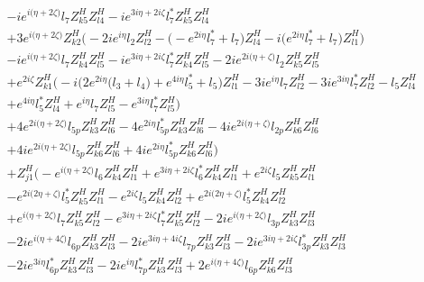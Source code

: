 \begin{align}
 &-i e^{i \Big(\eta +2 \zeta \Big)} l_7 Z_{{k 5}}^{H} Z_{{l 4}}^{H} -i e^{3 i \eta +2 i \zeta } l_7^* Z_{{k 5}}^{H} Z_{{l 4}}^{H} \nonumber \\ 
 &+3 e^{i \Big(\eta +2 \zeta \Big)} Z_{{k 2}}^{H} \Big(-2 i e^{i \eta } l_2 Z_{{l 2}}^{H}  - \Big(- e^{2 i \eta } l_7^*  + l_7\Big)Z_{{l 4}}^{H}  -i \Big(e^{2 i \eta } l_7^*  + l_7\Big)Z_{{l 1}}^{H} \Big)\nonumber \\ 
 &-i e^{i \Big(\eta +2 \zeta \Big)} l_7 Z_{{k 4}}^{H} Z_{{l 5}}^{H} -i e^{3 i \eta +2 i \zeta } l_7^* Z_{{k 4}}^{H} Z_{{l 5}}^{H} -2 i e^{2 i \Big(\eta +\zeta \Big)} l_2 Z_{{k 5}}^{H} Z_{{l 5}}^{H} \nonumber \\ 
 &+e^{2 i \zeta } Z_{{k 1}}^{H} \Big(-i \Big(2 e^{2 i \eta } \Big(l_3 + l_4\Big) + e^{4 i \eta } l_5^*  + l_5\Big)Z_{{l 1}}^{H} -3 i e^{i \eta } l_7 Z_{{l 2}}^{H} -3 i e^{3 i \eta } l_7^* Z_{{l 2}}^{H} - l_5 Z_{{l 4}}^{H} \nonumber \\ 
 &+e^{4 i \eta } l_5^* Z_{{l 4}}^{H} +e^{i \eta } l_7 Z_{{l 5}}^{H} - e^{3 i \eta } l_7^* Z_{{l 5}}^{H} \Big)\nonumber \\ 
 &+4 e^{2 i \Big(\eta +2 \zeta \Big)} l_{5p} Z_{{k 3}}^{H} Z_{{l 6}}^{H} -4 e^{2 i \eta } l_{5p}^* Z_{{k 3}}^{H} Z_{{l 6}}^{H} -4 i e^{2 i \Big(\eta +\zeta \Big)} l_{2p} Z_{{k 6}}^{H} Z_{{l 6}}^{H} \nonumber \\ 
 &+4 i e^{2 i \Big(\eta +2 \zeta \Big)} l_{5p} Z_{{k 6}}^{H} Z_{{l 6}}^{H} +4 i e^{2 i \eta } l_{5p}^* Z_{{k 6}}^{H} Z_{{l 6}}^{H} \Big)\nonumber \\ 
 &+Z_{{j 1}}^{H} \Big(- e^{i \Big(\eta +2 \zeta \Big)} l_6 Z_{{k 4}}^{H} Z_{{l 1}}^{H} +e^{3 i \eta +2 i \zeta } l_6^* Z_{{k 4}}^{H} Z_{{l 1}}^{H} +e^{2 i \zeta } l_5 Z_{{k 5}}^{H} Z_{{l 1}}^{H} \nonumber \\ 
 &- e^{2 i \Big(2 \eta +\zeta \Big)} l_5^* Z_{{k 5}}^{H} Z_{{l 1}}^{H} - e^{2 i \zeta } l_5 Z_{{k 4}}^{H} Z_{{l 2}}^{H} +e^{2 i \Big(2 \eta +\zeta \Big)} l_5^* Z_{{k 4}}^{H} Z_{{l 2}}^{H} \nonumber \\ 
 &+e^{i \Big(\eta +2 \zeta \Big)} l_7 Z_{{k 5}}^{H} Z_{{l 2}}^{H} - e^{3 i \eta +2 i \zeta } l_7^* Z_{{k 5}}^{H} Z_{{l 2}}^{H} -2 i e^{i \Big(\eta +2 \zeta \Big)} l_{3p} Z_{{k 3}}^{H} Z_{{l 3}}^{H} \nonumber \\ 
 &-2 i e^{i \Big(\eta +4 \zeta \Big)} l_{6p} Z_{{k 3}}^{H} Z_{{l 3}}^{H} -2 i e^{3 i \eta +4 i \zeta } l_{7p} Z_{{k 3}}^{H} Z_{{l 3}}^{H} -2 i e^{3 i \eta +2 i \zeta } l_{3p}^* Z_{{k 3}}^{H} Z_{{l 3}}^{H} \nonumber \\ 
 &-2 i e^{3 i \eta } l_{6p}^* Z_{{k 3}}^{H} Z_{{l 3}}^{H} -2 i e^{i \eta } l_{7p}^* Z_{{k 3}}^{H} Z_{{l 3}}^{H} +2 e^{i \Big(\eta +4 \zeta \Big)} l_{6p} Z_{{k 6}}^{H} Z_{{l 3}}^{H} \nonumber \\ 

\end{align}

